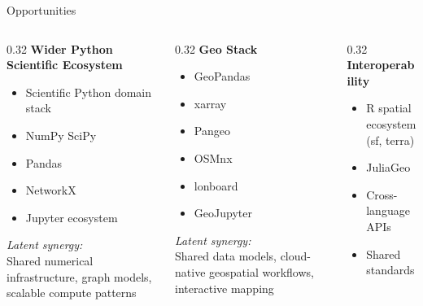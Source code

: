 \documentclass[11pt, aspectratio=169]{beamer}
\begin{document}
\begin{frame}{Opportunities}
\centering

\begin{columns}[T,onlytextwidth]

\begin{column}{0.32\textwidth}
\textbf{Wider Python Scientific Ecosystem}

\vspace{0.4cm}
\begin{itemize}
\item Scientific Python domain stack
\item NumPy SciPy
\item Pandas
\item NetworkX
\item Jupyter ecosystem
\end{itemize}

\vspace{0.3cm}
{\small \textit{Latent synergy:}}\\
Shared numerical infrastructure, graph models, scalable compute patterns
\end{column}

\begin{column}{0.32\textwidth}
\textbf{Geo Stack}

\vspace{0.4cm}
\begin{itemize}
\item GeoPandas
\item xarray
\item Pangeo
\item OSMnx
\item lonboard
\item GeoJupyter
\end{itemize}

\vspace{0.3cm}
{\small \textit{Latent synergy:}}\\
Shared data models, cloud-native geospatial workflows, interactive mapping
\end{column}

\begin{column}{0.32\textwidth}
\textbf{Interoperability}

\vspace{0.4cm}
\begin{itemize}
\item R spatial ecosystem (sf, terra)
\item JuliaGeo
\item Cross-language APIs
\item Shared standards
\end{itemize}


\end{column}
\end{columns}
\end{frame}
\end{document}
